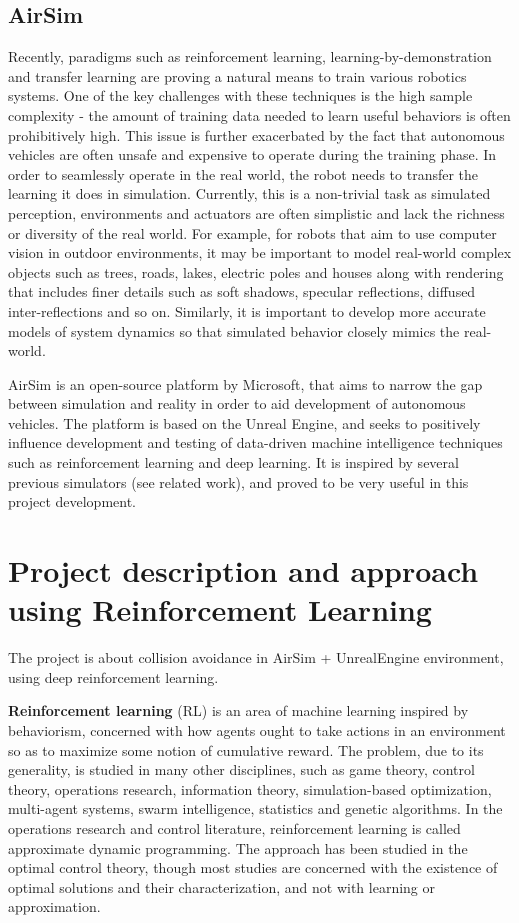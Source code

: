 \documentclass{article}
\begin{document}
\subsection{AirSim}

Recently, paradigms such as reinforcement learning, learning-by-demonstration
and transfer learning are proving a natural means to train various robotics
systems. One of the key challenges with these techniques is the high sample 
complexity - the amount of training data needed to learn useful behaviors is often 
prohibitively high. This issue is further exacerbated by the fact that autonomous 
vehicles are often unsafe and expensive to operate during the training phase. In order to
seamlessly operate in the real world, the robot needs to transfer the learning it does
in simulation. Currently, this is a non-trivial task as simulated perception, environments 
and actuators are often simplistic and lack the richness or diversity of the
real world. For example, for robots that aim to use computer vision in outdoor 
environments, it may be important to model real-world complex objects such as trees,
roads, lakes, electric poles and houses along with rendering that includes finer 
details such as soft shadows, specular reflections, diffused inter-reflections and so on.
Similarly, it is important to develop more accurate models of system dynamics so
that simulated behavior closely mimics the real-world.

AirSim  is  an  open-source  platform \cite{airsim2017fsr} by Microsoft, 
that  aims  to  narrow  the  gap  between
simulation  and  reality  in  order  to  
aid  development  of  autonomous  vehicles.  
The platform is based on the Unreal Engine, and seeks to positively 
influence development and testing of data-driven
machine intelligence techniques such as reinforcement learning and 
deep learning. It is inspired by several previous simulators (see 
related work), and proved to be very useful in this project development.

\section{Project description and approach using Reinforcement Learning}

The project is about collision avoidance in AirSim + 
UnrealEngine environment, using deep reinforcement learning.

{\bf Reinforcement learning }(RL) is an area of machine learning inspired 
by behaviorism, concerned with how agents ought to take actions in an 
environment so as to maximize some notion of cumulative reward. 
The problem, due to its generality, is studied in many other disciplines, 
such as game theory, control theory, operations research, information theory, 
simulation-based optimization, multi-agent systems, swarm intelligence, 
statistics and genetic algorithms. In the operations research and 
control literature, reinforcement learning is called approximate dynamic 
programming. The approach has been studied in the optimal control theory, 
though most studies are concerned with the existence of optimal 
solutions and their characterization, and not with learning or approximation.
\end{document}
